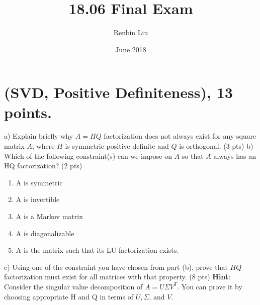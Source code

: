 \documentclass{article}
\title{18.06 Final Exam}
\author{Renbin Liu }
\date{June 2018}
\begin{document}
\maketitle

\section{ (SVD, Positive Definiteness), 13 points. }
\newline a) Explain briefly why \(A = HQ\) factorization does not always exist for any square matrix \(A\), where \(H\) is symmetric positive-definite and \(Q\) is orthogonal. (3 pts)
\newline
\newline b) Which of the following constraint(s) can we impose on \(A\) so that \(A\) always has an HQ factorization? (2 pts)
\begin{enumerate}
    \item A is symmetric
    \item A is invertible
    \item A is a Markov matrix
    \item A is diagonalizable
    \item A is the matrix such that its LU factorization exists.
\end{enumerate}
\newline
\newline c) Using one of the constraint you have chosen from part (b), prove that \(HQ\) factorization must exist for all matrices with that property. (8 pts)
\newline \textbf{Hint}: Consider the singular value decomposition of \(A = U\Sigma V^T\). You can prove it by choosing appropriate H and Q in terms of \(U, \Sigma\), and \(V\).
\newline 
\end{document}
